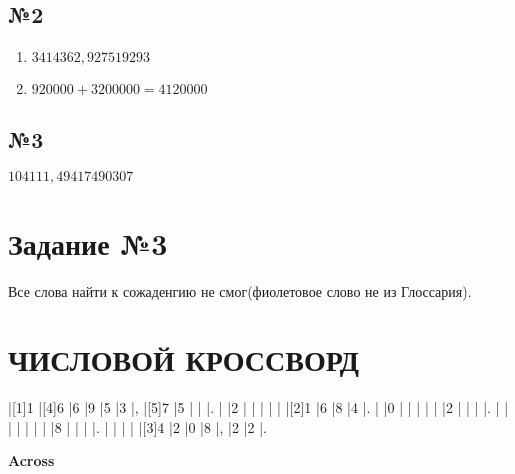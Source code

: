 \documentclass[a4paper, 12pt]{article}
\begin{document}
	\subsection{№2}
	\begin{enumerate}
		\item $3 414 362,927519293$
		\item $920 000 + 3 200 000 = 4 120 000$
	\end{enumerate}
	\subsection{№3}
	$104 111,49417490307$
	\section{Задание №3}
	Все слова найти к сожаденгию не смог(фиолетовое слово не из Глоссария).
	
	\section{ЧИСЛОВОЙ КРОССВОРД}
	\pagebreak
	\PuzzleSolution
	\begin{Puzzle}{11}{5}
		|[1]1  |[4]6  |6    |9    |5    |3    |,   |[5]7  |5   |{}  |{} |.
		|{}    |2     |{}   |{}   |{}   |{}   |{}  |[2]1  |6   |8   |4  |.
		|{}    |0     |{}   |{}   |{}   |{}   |{}  |2     |{}  |{}  |{} |.
		|{}    |{}    |{}   |{}   |{}   |{}   |{}  |8     |{}  |{}  |{} |.
		|{}    |{}    |{}   |{}   |[3]4 |2    |0   |8     |,   |2   |2  |.
	\end{Puzzle}

	\begin{PuzzleClues}{\textbf{Across}}
	\end{PuzzleClues}
\end{document}
